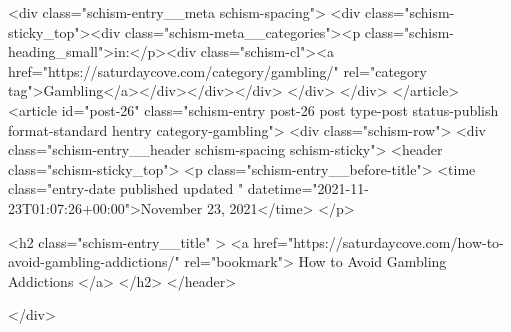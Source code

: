 {		<div class="schism-entry__meta schism-spacing">			<div class="schism-sticky_top"><div class="schism-meta__categories"><p class="schism-heading_small">in:</p><div class="schism-cl"><a href="https://saturdaycove.com/category/gambling/" rel="category tag">Gambling</a></div></div></div>		</div>
	</div>
</article>
<article id="post-26" class="schism-entry post-26 post type-post status-publish format-standard hentry category-gambling">
	<div class="schism-row">		<div class="schism-entry__header schism-spacing schism-sticky">			<header class="schism-sticky_top">				<p class="schism-entry__before-title">
					<time class="entry-date published updated " datetime="2021-11-23T01:07:26+00:00">November 23, 2021</time>				</p>

				<h2 class="schism-entry__title" >
					<a href="https://saturdaycove.com/how-to-avoid-gambling-addictions/" rel="bookmark">
						How to Avoid Gambling Addictions					</a>
				</h2>
			</header>

					</div>

}
